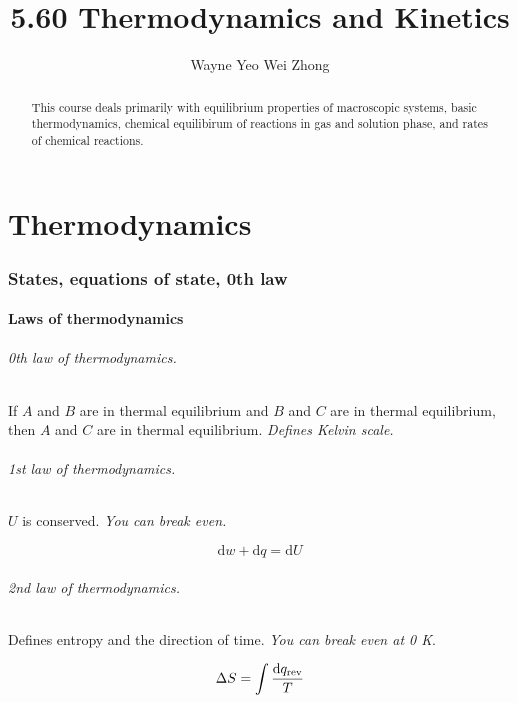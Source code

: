 \documentclass{article}
\title{5.60 Thermodynamics and Kinetics}
\author{Wayne Yeo Wei Zhong}
\numberwithin{theorem}{section}
\numberwithin{corollary}{section}
\numberwithin{postulate}{section}
\numberwithin{lemma}{section}
\numberwithin{definition}{section}
\begin{document}
\maketitle

\begin{abstract}
  This course deals primarily with equilibrium properties of macroscopic
  systems, basic thermodynamics, chemical equilibirum of reactions in gas and
  solution phase, and rates of chemical reactions.
\end{abstract}

\tableofcontents
\newpage

\part{Thermodynamics}

\setcounter{section}{0}
\section{States, equations of state, 0th law}

\subsection{Laws of thermodynamics}

\paragraph{0th law of thermodynamics.} If $A$ and $B$ are in thermal equilibrium
and $B$ and $C$ are in thermal equilibrium, then $A$ and $C$ are in thermal equilibrium.
\textit{Defines Kelvin scale.}

\paragraph{1st law of thermodynamics.} $U$ is conserved. \textit{You can break
even.}

\begin{equation}
  \mathrm{d}w + \mathrm{d}q = \mathrm{d}U
\end{equation}

\paragraph{2nd law of thermodynamics.} Defines entropy and the direction of
time. \textit{You can break even at 0 K}.

\begin{equation}
  \Delta S = \int \frac{\textnormal{d} q_{\mathrm{rev}}}{T}
\end{equation}
\end{document}
